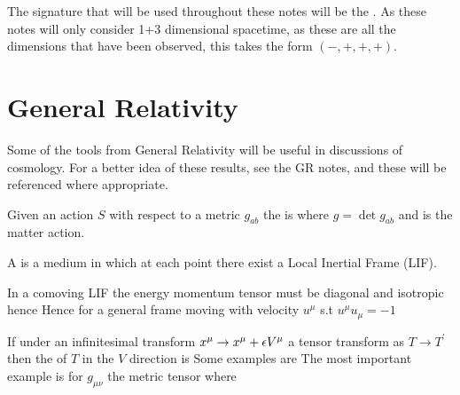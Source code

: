 \documentclass{article}
\begin{document}
\begin{definition}
The signature that will be used throughout these notes will be the . As these notes will only consider 1+3 dimensional spacetime, as these are all the dimensions that have been observed, this takes the form $(-,+,+,+)$. 
\end{definition}
\section{General Relativity}
Some of the tools from General Relativity will be useful in discussions of cosmology. For a better idea of these results, see the GR notes, and these will be referenced where appropriate. 

\begin{definition}
Given an action $S$ with respect to a metric $g_{ab}$ the  is 
where $g=\det g_{ab}$ and 
is the matter action. 
\end{definition}

\begin{definition}
A  is a medium in which at each point there exist a Local Inertial Frame (LIF). 
\end{definition}

\begin{fact}
In a comoving LIF the energy momentum tensor must be diagonal and isotropic hence 
Hence for a general frame moving with velocity $u^\mu$ s.t $u^\mu u_\mu = - 1$ 
\end{fact}


\begin{definition}
If under an infinitesimal transform $x^\mu \to x^\mu + \epsilon V^\mu$ a tensor transform as $T \to T^\prime$ then the  of $T$ in the $V$ direction is 
Some examples are 
The most important example is for $g_{\mu\nu}$ the metric tensor where
\end{definition}
\end{document}
